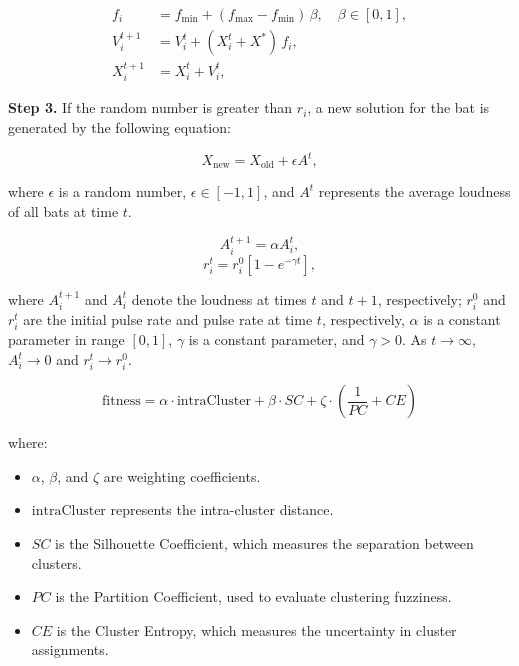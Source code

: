 \documentclass[12pt,twoside]{article}
\begin{document}
\begin{align*}
f_i &= f_{\text{min}} + (f_{\text{max}} - f_{\text{min}}) \, \beta, \quad \beta \in [0, 1], \\
V_i^{t+1} &= V_i^t + (X_i^t + X^*) \, f_i, \\
X_i^{t+1} &= X_i^t + V_i^t,
\end{align*}

\textbf{Step 3.} If the random number is greater than \( r_i \), a new solution for the bat is generated by the following equation:

\begin{equation*}
X_{\text{new}} = X_{\text{old}} + \epsilon A^t,
\end{equation*}

where \( \epsilon \) is a random number, \( \epsilon \in [-1, 1] \), and \( A^t \) represents the average loudness of all bats at time \( t \).

\[
A_i^{t+1} = \alpha A_i^t,
\]
\[
r_i^t = r_i^0 \left[1 - e^{-\gamma t}\right],
\]

where \( A_i^{t+1} \) and \( A_i^t \) denote the loudness at times \( t \) and \( t+1 \), respectively; \( r_i^0 \) and \( r_i^t \) are the initial pulse rate and pulse rate at time \( t \), respectively, \( \alpha \) is a constant parameter in range \( [0, 1] \), \( \gamma \) is a constant parameter, and \( \gamma > 0 \). As \( t \rightarrow \infty \), \( A_i^t \rightarrow 0 \) and \( r_i^t \rightarrow r_i^0 \).

\[
\text{fitness} = \alpha \cdot \text{intraCluster} + \beta \cdot SC + \zeta \cdot \left( \frac{1}{PC} + CE \right)
\]

where:
\begin{itemize}
    \item \(\alpha\), \(\beta\), and \(\zeta\) are weighting coefficients.
    \item \(\text{intraCluster}\) represents the intra-cluster distance.
    \item \(SC\) is the Silhouette Coefficient, which measures the separation between clusters.
    \item \(PC\) is the Partition Coefficient, used to evaluate clustering fuzziness.
    \item \(CE\) is the Cluster Entropy, which measures the uncertainty in cluster assignments.
\end{itemize}
\end{document}

